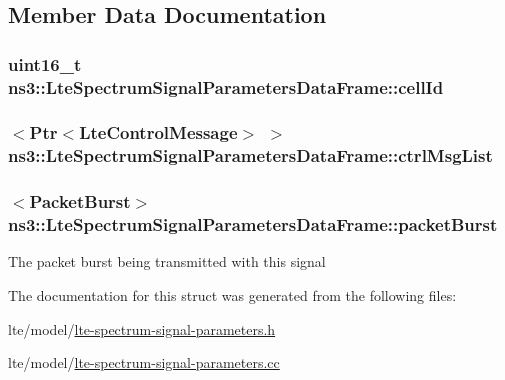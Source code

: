 \subsection{Member Data Documentation}
\subsubsection[{\texorpdfstring{cell\+Id}{cellId}}]{\setlength{\rightskip}{0pt plus 5cm}uint16\+\_\+t ns3\+::\+Lte\+Spectrum\+Signal\+Parameters\+Data\+Frame\+::cell\+Id}\hypertarget{structns3_1_1LteSpectrumSignalParametersDataFrame_aed33b300ea4ff7a70f6d42c9ea2226ea}{}\label{structns3_1_1LteSpectrumSignalParametersDataFrame_aed33b300ea4ff7a70f6d42c9ea2226ea}
\subsubsection[{\texorpdfstring{ctrl\+Msg\+List}{ctrlMsgList}}]{$<${\bf Ptr}$<${\bf Lte\+Control\+Message}$>$ $>$ ns3\+::\+Lte\+Spectrum\+Signal\+Parameters\+Data\+Frame\+::ctrl\+Msg\+List}\hypertarget{structns3_1_1LteSpectrumSignalParametersDataFrame_aa749709d3d235856a82e749e331e3e58}{}\label{structns3_1_1LteSpectrumSignalParametersDataFrame_aa749709d3d235856a82e749e331e3e58}
\subsubsection[{\texorpdfstring{packet\+Burst}{packetBurst}}]{$<${\bf Packet\+Burst}$>$ ns3\+::\+Lte\+Spectrum\+Signal\+Parameters\+Data\+Frame\+::packet\+Burst}\hypertarget{structns3_1_1LteSpectrumSignalParametersDataFrame_add8e31df8ae232dec2558cbb733c311e}{}\label{structns3_1_1LteSpectrumSignalParametersDataFrame_add8e31df8ae232dec2558cbb733c311e}
The packet burst being transmitted with this signal 

The documentation for this struct was generated from the following files\+:\begin{DoxyCompactItemize}
\item 
lte/model/\hyperlink{lte-spectrum-signal-parameters_8h}{lte-\/spectrum-\/signal-\/parameters.\+h}\item 
lte/model/\hyperlink{lte-spectrum-signal-parameters_8cc}{lte-\/spectrum-\/signal-\/parameters.\+cc}\end{DoxyCompactItemize}
